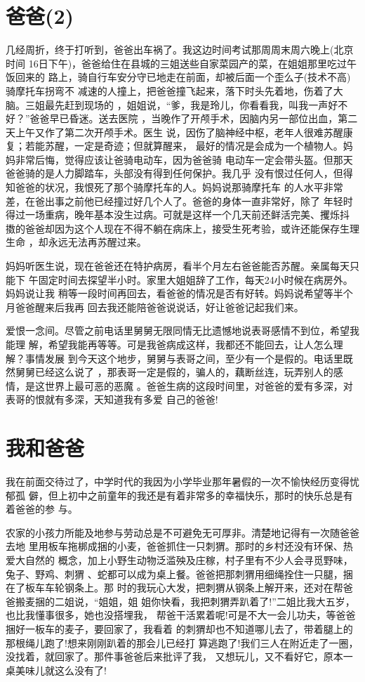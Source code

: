 \documentclass[12pt]{book}
\begin{document}
\section{爸爸(2)}
\label{sec-9-4}

几经周折，终于打听到，爸爸出车祸了。我这边时间考试那周周末周六晚上(北京时间
16日下午)，爸爸给住在县城的三姐送些自家菜园产的菜，在姐姐那里吃过午饭回来的
路上，骑自行车安分守已地走在前面，却被后面一个歪么子(技术不高)骑摩托车拐弯不
减速的人撞上，把爸爸撞飞起来，落下时头先着地，伤着了大脑。三姐最先赶到现场的
，姐姐说，“爹，我是玲儿，你看看我，叫我一声好不好？”爸爸早已昏迷。送去医院
，当晚作了开颅手术，因脑内另一部位出血，第二天上午又作了第二次开颅手术。医生
说，因伤了脑神经中枢，老年人很难苏醒康复；若能苏醒，一定是奇迹；但就算醒来，
最好的情况是会成为一个植物人。妈妈非常后悔，觉得应该让爸骑电动车，因为爸爸骑
电动车一定会带头盔。但那天爸爸骑的是人力脚踏车，头部没有得到任何保护。我几乎
没有恨过任何人，但得知爸爸的状况，我恨死了那个骑摩托车的人。妈妈说那骑摩托车
的人水平非常差，在爸出事之前他已经撞过好几个人了。爸爸的身体一直非常好，除了
年轻时得过一场重病，晚年基本没生过病。可就是这样一个几天前还鲜活完美、攫烁抖
擞的爸爸却因为这个人现在不得不躺在病床上，接受生死考验，或许还能保存生理生命
，却永远无法再苏醒过来。

妈妈听医生说，现在爸爸还在特护病房，看半个月左右爸爸能否苏醒。亲属每天只能下
午固定时间去探望半小时。家里大姐姐辞了工作，每天24小时候在病房外。妈妈说让我
稍等一段时间再回去，看爸爸的情况是否有好转。妈妈说希望等半个月爸爸醒来后我再
回去我还能陪爸爸说说话，好让爸爸记起我们来。

爱恨一念间。尽管之前电话里舅舅无限同情无比遗憾地说表哥感情不到位，希望我能理
解，希望我能再等等。可是我爸病成这样，我都还不能回去，让人怎么理解？事情发展
到今天这个地步，舅舅与表哥之间，至少有一个是假的。电话里既然舅舅已经这么说了
，那表哥一定是假的，骗人的，藕断丝连，玩弄别人的感情，是这世界上最可恶的恶魔
。爸爸生病的这段时间里，对爸爸的爱有多深，对表哥的恨就有多深，天知道我有多爱
自己的爸爸!
\section{我和爸爸}
\label{sec-9-5}

我在前面交待过了，中学时代的我因为小学毕业那年暑假的一次不愉快经历变得忧郁孤
僻，但上初中之前童年的我还是有着非常多的幸福快乐，那时的快乐总是有着爸爸的参
与。

农家的小孩力所能及地参与劳动总是不可避免无可厚非。清楚地记得有一次随爸爸去地
里用板车拖梆成捆的小麦，爸爸抓住一只刺猬。那时的乡村还没有环保、热爱大自然的
概念，加上小野生动物泛滥殃及庄稼，村子里有不少人会寻觅野味，兔子、野鸡、刺猬
、蛇都可以成为桌上餐。爸爸把那刺猬用细绳拴住一只腿，捆在了板车车轮钢条上。那
时的我玩心大发，把刺猬从钢条上解开来，还对在帮爸爸搬麦捆的二姐说，“姐姐，姐
姐你快看，我把刺猬弄趴着了!”二姐比我大五岁，也比我懂事很多，她也没搭埋我，
帮爸干活累着呢!可是不大一会儿功夫，等爸爸捆好一板车的麦子，要回家了，我看着
的刺猬却也不知道哪儿去了，带着腿上的那根绳儿跑了!想来刚刚趴着的那会儿已经打
算逃跑了!我们三人在附近走了一圈，没找着，就回家了。那件事爸爸后来批评了我，
又想玩儿，又不看好它，原本一桌美味儿就这么没有了!
\end{document}
